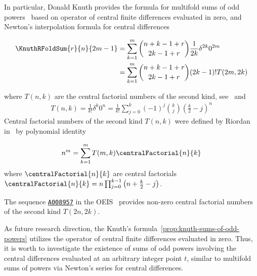 In particular, Donald Knuth provides the formula for multifold sums of odd powers~\cite{knuth1993johann}
based on operator of central finite differences evaluated in zero,
and Newton's interpolation formula for central differences~\cite{kolosov_2025_18098442}
\begin{proposition}
  \label{prop:knuth-sums-of-odd-powers}
  \begin{align*}
    \KnuthRFoldSum{r}{n}{2m-1}
    &= \sum_{k=1}^{m} \binom{n+k-1+r}{2k-1+r} \frac{1}{2k} \delta^{2k} 0^{2m} \\
    &= \sum_{k=1}^{m} \binom{n+k-1+r}{2k-1+r} (2k-1)! T(2m, 2k)
  \end{align*}
\end{proposition}
where $T(n,k)$ are the central factorial numbers of the second
kind, see~\cite[section 58]{steffensen1927interpolation} and~\cite[formula (10a)]{carlitz1963divided}
\begin{align*}
  T(n, k) = \frac{1}{k!} \delta^k 0^n = \frac{1}{k!} \sum_{j=0}^{k} (-1)^j \binom{k}{j} \left( \frac{k}{2} - j \right)^n
\end{align*}
Central factorial numbers of the second kind $T(n,k)$ were defined by Riordan
in~\cite[ch. 6.5, formula (24)]{riordan1968combinatorial}
by polynomial identity
\begin{lemma} 
  \begin{align*}
    n^m = \sum_{k=1}^{m} T(m,k) \centralFactorial{n}{k}
  \end{align*}
  where $\centralFactorial{n}{k}$ are central factorials
  $\centralFactorial{n}{k} = n \prod_{j=0}^{k-1} \left( n + \frac{k}{2} -j \right)$.
\end{lemma}
The sequence
\href{https://oeis.org/A008957}{\texttt{A008957}}
in the OEIS~\cite{sloane2003line} provides non-zero central factorial numbers of the second kind $T(2n,2k)$.

As future research direction,
the Knuth's formula~\eqref{prop:knuth-sums-of-odd-powers} utilizes the operator
of central finite differences evaluated in zero.
Thus, it is worth to investigate the existence of sums of odd powers involving the central differences
evaluated at an arbitrary integer point $t$,
similar to multifold sums of powers via Newton's series for central differences.
